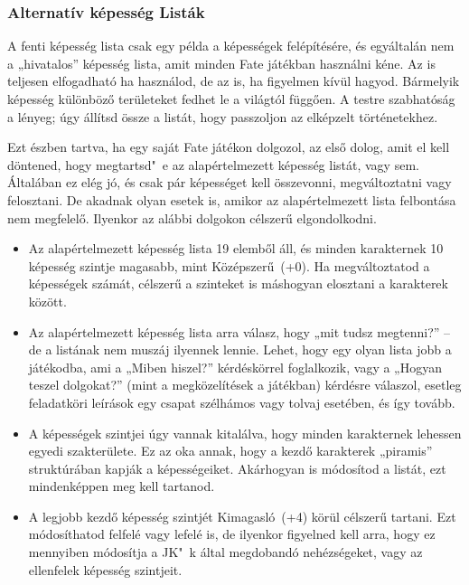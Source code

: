 \subsubsection{Alternatív képesség Listák}

A fenti képesség lista csak egy példa a képességek felépítésére, és egyáltalán nem a „hivatalos” képesség lista, amit minden Fate játékban használni kéne. Az is teljesen elfogadható ha használod, de az is, ha figyelmen kívül hagyod. Bármelyik képesség különböző területeket fedhet le a világtól függően. A testre szabhatóság a lényeg; úgy állítsd össze a listát, hogy passzoljon az elképzelt történetekhez.

Ezt észben tartva, ha egy saját Fate játékon dolgozol, az első dolog, amit el kell döntened, hogy megtartsd"~e az alapértelmezett képesség listát, vagy sem. Általában ez elég jó, és csak pár képességet kell összevonni, megváltoztatni vagy felosztani. De akadnak olyan esetek is, amikor az alapértelmezett lista felbontása nem megfelelő. Ilyenkor az alábbi dolgokon célszerű elgondolkodni.

\begin{itemize}
    \item Az alapértelmezett képesség lista 19 elemből áll, és minden karakternek 10 képesség szintje magasabb, mint Középszerű~(+0). Ha megváltoztatod a képességek számát, célszerű a szinteket is máshogyan elosztani a karakterek között.
    \item Az alapértelmezett képesség lista arra válasz, hogy „mit tudsz megtenni?” – de a listának nem muszáj ilyennek lennie. Lehet, hogy egy olyan lista jobb a játékodba, ami a „Miben hiszel?” kérdéskörrel foglalkozik, vagy a „Hogyan teszel dolgokat?” (mint a megközelítések a  játékban) kérdésre válaszol, esetleg feladatköri leírások egy csapat szélhámos vagy tolvaj esetében, és így tovább.
    \item A képességek szintjei úgy vannak kitalálva, hogy minden karakternek lehessen egyedi szakterülete. Ez az oka annak, hogy a kezdő karakterek „piramis” struktúrában kapják a képességeiket. Akárhogyan is módosítod a listát, ezt mindenképpen meg kell tartanod.
    \item A legjobb kezdő képesség szintjét Kimagasló~(+4) körül célszerű tartani. Ezt módosíthatod felfelé vagy lefelé is, de ilyenkor figyelned kell arra, hogy ez mennyiben módosítja a JK"~k által megdobandó nehézségeket, vagy az ellenfelek képesség szintjeit.
\end{itemize}

